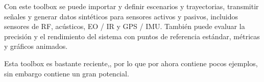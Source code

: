 Con este toolbox se puede importar y definir escenarios y trayectorias, transmitir señales y generar datos sintéticos para sensores activos y pasivos, incluidos sensores de RF, acústicos, EO / IR y GPS / IMU. También puede evaluar la precisión y el rendimiento del sistema con puntos de referencia estándar, métricas y gráficos animados. 

Esta toolbox es bastante reciente,, por lo que por ahora contiene pocos ejemplos, sin embargo contiene un gran potencial. 
